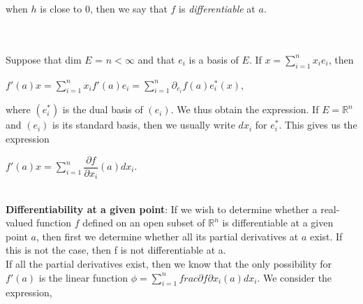 \documentclass[11 pt]{article}
\theoremstyle{definition}
\theoremstyle{remark}
\newcommand{\R}{\mathbb{R}}
\begin{document}
when $h$ is close to 0, then we say that $f$ is \textit{differentiable} at $a$.\\





\normalfont \\~\\

Suppose that dim $E$ = $n < \infty$ and that $e_i$ is a basis of $E$. If $ x = \sum_{i=1}^{n} x_i e_i$, then\\
\begin{center}
$ f'(a)x = \sum_{i=1}^{n} x_i f'(a) e_i = \sum_{i=1}^{n} \partial_{e_i} f(a) e_i^*(x)$,
\end{center}

where $(e_i^*)$ is the dual basis of $(e_i)$. We thus obtain the expression. If $E = \R^n$ and $(e_i)$ is its standard basis, then we usually write $dx_i$ for $e_i^*$. This gives us the expression \\
\begin{center}
$ f'(a)x = \sum_{i=1}^{n} \dfrac{\partial f}{\partial x_i} (a) dx_i $.
\end{center}

\\
\textbf{Differentiability at a given point}:
If we wish to determine whether a real-valued function $f$ defined on an open subset of $\R^n$ is differentiable at a given point $a$, then first we determine whether all its partial derivatives at $a$
exist. If this is not the case, then f is not differentiable at a.\\ 
If all the partial derivatives exist, then we know that the only possibility for $f'(a)$ is the linear function $ \phi = \sum_{i=1}^{n} frac{\partial f}{\partial x_i} (a) dx_i $. We consider the expression,\\
\end{document}
